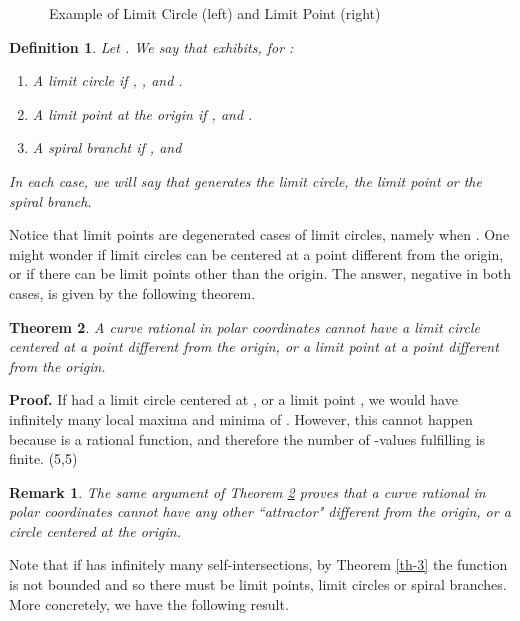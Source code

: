 \documentclass{elsart}
\def\qed{\hfill  \framebox(5,5){}}
\newtheorem{theorem}{{\bf Theorem}}
\newtheorem{remark}{{\bf Remark}}
\newtheorem{definition}[theorem]{{\bf Definition}}
\begin{document}
\begin{figure}[ht]
\begin{center}
\centerline{}
\end{center}
\caption{Example of Limit Circle (left) and Limit Point  (right)}\label{clpl}
\end{figure}



\begin{definition} \label{def-limit-spiral}
Let . We say that  exhibits, for :
\begin{enumerate}
\item  A {\sf limit circle} if , , and .
\item  A {\sf limit point} at the origin if , and .
\item   A {\sf spiral branch}t if , and 
\end{enumerate}
In each case, we will say that  {\it generates} the limit circle, the limit point or the spiral branch.
\end{definition}

Notice that limit points are degenerated cases of limit circles, namely when . One might wonder if limit circles can be centered
at a point different from the origin, or if there can be limit points other than the origin. The answer, negative in both cases, is given by the
following theorem.

\begin{theorem} \label{no-limit}
 A curve rational in polar coordinates cannot have a limit circle centered at a point different from the origin, or a limit point at a point
different from the origin.
\end{theorem}

{\bf Proof.} If  had a limit circle centered at , or a limit point , we would have infinitely
many local maxima and minima of . However, this cannot happen because  is a rational function,
and therefore the number of -values fulfilling  is finite. \qed



\begin{remark} \label{rem-2}  The same argument of Theorem \ref{no-limit} proves that
a curve rational in polar coordinates cannot have any other ``attractor"
different from the origin, or a circle centered at the origin.
\end{remark}

 Note that if  has infinitely many self-intersections, by Theorem \ref{th-3} the function  is not bounded and so there must be limit points, limit circles or spiral branches. More concretely, we have the following result.  
\end{document}
